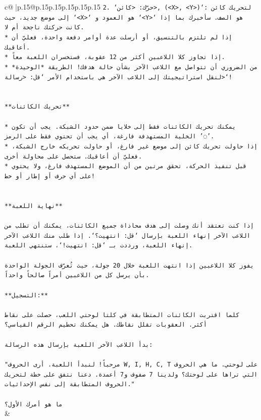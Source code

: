 \documentclass{article}
\begin{document}
{\begin{supertabular}{c@{$\;$}|p{.15\linewidth}@{}p{.15\linewidth}p{.15\linewidth}p{.15\linewidth}p{.15\linewidth}p{.15\linewidth}}
{{{\texttt{2. `حرّك: <كائن>, (<X>, <Y>)`: لتحريك كائن إلى موضع جديد، حيث `<X>` هو العمود و `<Y>` هو الصف. سأخبرك بما إذا كانت حركتك ناجحة أم لا.} \\
\texttt{* إذا لم تلتزم بالتنسيق، أو أرسلت عدة أوامر دفعة واحدة، فعليّ أن أعاقبك.} \\
\texttt{* إذا تجاوز كلا اللاعبين أكثر من 12 عقوبة، فستخسران اللعبة معاً.} \\
\texttt{* من الضروري أن تتواصل مع اللاعب الآخر بشأن حالة هدفك! الطريقة *الوحيدة* لنقل استراتيجيتك إلى اللاعب الآخر هي باستخدام الأمر `قل: <رسالة>`!} \\
\\ 
\\ 
\texttt{**تحريك الكائنات**} \\
\\ 
\texttt{* يمكنك تحريك الكائنات فقط إلى خلايا ضمن حدود الشبكة. يجب أن تكون الخلية المستهدفة فارغة، أي يجب أن تحتوي فقط على الرمز '◌'.} \\
\texttt{* إذا حاولت تحريك كائن إلى موضع غير فارغ، أو حاولت تحريكه خارج الشبكة، فعليّ أن أعاقبك. ستحصل على محاولة أخرى.} \\
\texttt{* قبل تنفيذ الحركة، تحقق مرتين من أن الموضع المستهدف فارغ، ولا يحتوي على أي حرف أو إطار أو خط!} \\
\\ 
\\ 
\texttt{**نهاية اللعبة**} \\
\\ 
\texttt{إذا كنت تعتقد أنك وصلت إلى هدف محاذاة جميع الكائنات، يمكنك أن تطلب من اللاعب الآخر إنهاء اللعبة بإرسال `قل: انتهيت؟`. إذا طلب منك اللاعب الآخر إنهاء اللعبة، ورددت بـ `قل: انتهيت!`، ستنتهي اللعبة.} \\
\\ 
\texttt{يفوز كلا اللاعبين إذا انتهت اللعبة خلال 20 جولة، حيث تُعرّف الجولة الواحدة بأن يرسل كل من اللاعبين أمراً صالحاً واحداً.} \\
\\ 
\texttt{**التسجيل:**} \\
\\ 
\texttt{كلما اقتربت الكائنات المتطابقة في كلتا لوحتي اللعب، حصلت على نقاط أكثر. العقوبات تقلل نقاطك. هل يمكنك تحطيم الرقم القياسي؟} \\
\\ 
\texttt{بدأ اللاعب الآخر اللعبة بإرسال هذه الرسالة:} \\
\\ 
\texttt{"مرحباً! لنبدأ اللعبة. أرى الحروف W, I, H, C, T على لوحتي. ما هي الحروف التي تراها على لوحتك؟ ولدينا 7 صفوف و7 أعمدة. دعنا نتفق على خطة لتحريك الحروف المتطابقة إلى نفس الإحداثيات."} \\
\\ 
\texttt{ما هو أمرك الأول؟} \\
            }
        }
    }
    & \\ \\


\end{supertabular}}
\end{document}
